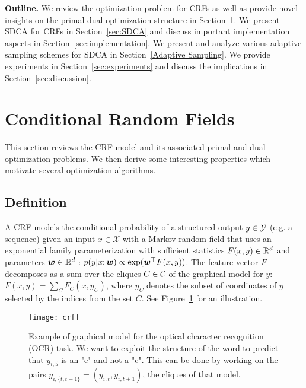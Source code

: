 \textbf{Outline.}
We review the optimization problem for CRFs as well as provide novel insights on the primal-dual optimization structure in Section~\ref{sec:CRF}.
We present SDCA for CRFs in Section~\ref{sec:SDCA} and discuss important implementation aspects in Section~\ref{sec:implementation}.
We present and analyze various adaptive sampling schemes for SDCA in Section~\ref{Adaptive Sampling}.
We provide experiments in Section~\ref{sec:experiments} and discuss the implications in Section~\ref{sec:discussion}.


\section{Conditional Random Fields} \label{sec:CRF}
This section reviews the CRF model and its associated primal and dual optimization problems.
We then derive some interesting properties which motivate several optimization algorithms.

\subsection{Definition}
A CRF models the conditional probability of a structured output $y \in {\mathcal Y}$ (e.g. a sequence) given an input $x\in \mathcal X$ with a Markov random field that uses an exponential family parameterization with sufficient statistics $F(x,y) \in \mathbb{R}^d$ and parameters $\boldsymbol{w} \in \mathbb{R}^d$ : $p(y | x ; \boldsymbol{w}) \propto \exp(\boldsymbol{w}^{\top}F(x, y))$. The feature vector $F$ decomposes as a sum over the cliques $C \in {\mathcal C}$ of the graphical model for $y$: $F(x, y) = \sum_C F_C(x, y_C)$, where $y_C$ denotes the subset of coordinates of $y$ selected by the indices from the set $C$. See Figure~\ref{crf example} for an illustration.


\begin{figure}
	\centering \texttt{[image: crf]}
	\caption[Example of graphical model for the optical character recognition (OCR) task]{
		Example of graphical model for the optical character recognition (OCR) task.
		We want to exploit the structure of the word to predict that $y_{i,5}$ is an "e" and not a "c".
		This can be done by working on the pairs $y_{i,\{t, t+1\} } = (y_{i, t}, y_{i, t+1})$, the cliques of that model.
	}
	\label{crf example}
\end{figure}

